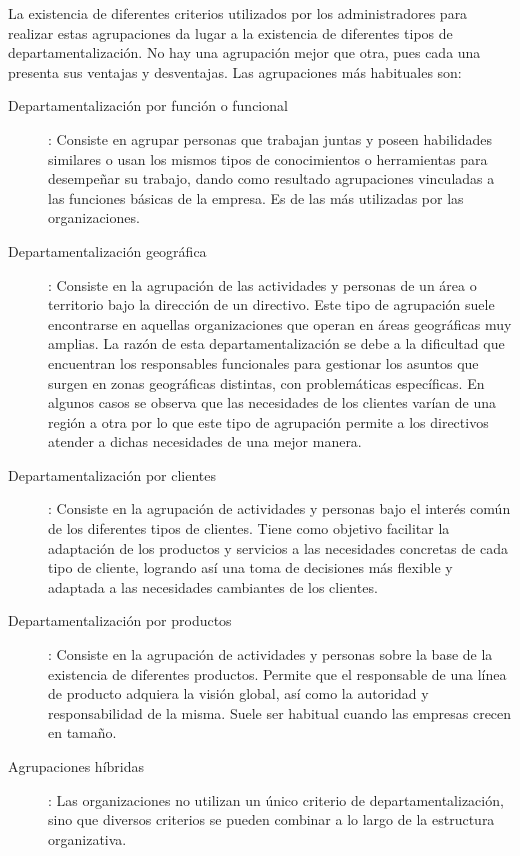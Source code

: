 \documentclass[12pt,a4paper,spanish]{report}
\begin{document}
				La existencia de diferentes criterios utilizados por los administradores para realizar estas agrupaciones da lugar a la existencia de diferentes tipos de departamentalización. No hay una agrupación mejor que otra, pues cada una presenta sus ventajas y desventajas. Las agrupaciones más habituales son:
				\begin{description}
					\item[Departamentalización por función o funcional]: Consiste en agrupar personas que trabajan juntas y poseen habilidades similares o usan los mismos tipos de conocimientos o herramientas para desempeñar su trabajo, dando como resultado agrupaciones vinculadas a las funciones básicas de la empresa. Es de las más utilizadas por las organizaciones.

					\item[Departamentalización geográfica]: Consiste en la agrupación de las actividades y personas de un área o territorio bajo la dirección de un directivo. Este tipo de agrupación suele encontrarse en aquellas organizaciones que operan en áreas geográficas muy amplias. La razón de esta departamentalización se debe a la dificultad que encuentran los responsables funcionales para gestionar los asuntos que surgen en zonas geográficas distintas, con problemáticas específicas. En algunos casos se observa que las necesidades de los clientes varían de una región a otra por lo que este tipo de agrupación permite a los directivos atender a dichas necesidades de una mejor manera.

					\item[Departamentalización por clientes]: Consiste en la agrupación de actividades y personas bajo el interés común de los diferentes tipos de clientes. Tiene como objetivo facilitar la adaptación de los productos y servicios a las necesidades concretas de cada tipo de cliente, logrando así una toma de decisiones más flexible y adaptada a las necesidades cambiantes de los clientes.

					\item[Departamentalización por productos]: Consiste en la agrupación de actividades y personas sobre la base de la existencia de diferentes productos. Permite que el responsable de una línea de producto adquiera la visión global, así como la autoridad y responsabilidad de la misma. Suele ser habitual cuando las empresas crecen en tamaño.

					\item[Agrupaciones híbridas]: Las organizaciones no utilizan un único criterio de departamentalización, sino que diversos criterios se pueden combinar a lo largo de la estructura organizativa.
				\end{description}
\end{document}
